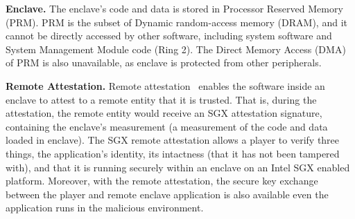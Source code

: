 \vspace{3mm}\noindent\textbf{Enclave.}
The enclave’s code and data is stored in Processor Reserved Memory (PRM). 
PRM is the subset of Dynamic random-access memory (DRAM), and it cannot be directly accessed by other software, including system software and System Management Module code (Ring 2).
The Direct Memory Access (DMA) of PRM is also unavailable, as enclave is protected from other peripherals.



\vspace{3mm}\noindent\textbf{Remote Attestation.} 
Remote attestation~\cite{costan2016intel} enables the software inside an  enclave to attest to a remote entity that it is trusted. That is, during the attestation, the remote entity would receive an SGX attestation signature, containing the enclave’s measurement (a measurement of the code and data loaded in enclave).
The SGX remote attestation allows a player to verify three things, the application's identity, its intactness (that it has not been tampered with), and that it is running securely within an enclave on an Intel SGX enabled platform.
Moreover, with the remote attestation, the secure key exchange between the player and remote enclave application is also available even the application runs in the malicious environment.

 